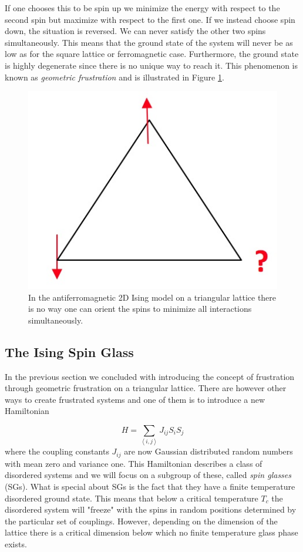 \documentclass[paper=a4, fontsize=11pt]{scrartcl} %
\numberwithin{equation}{section} %
\numberwithin{figure}{section} %
\numberwithin{table}{section} %
\begin{document}
If one chooses this to be spin up we minimize the energy with respect to the second spin but maximize with respect to the first one. If we instead choose spin down, the situation is reversed. We can never satisfy the other two spins simultaneously. This means that the ground state of the system will never be as low as for the square lattice or ferromagnetic case. Furthermore, the ground state is highly degenerate since there is no unique way to reach it. This phenomenon is known as \emph{geometric frustration} and is illustrated in Figure \ref{fig:frustration}.

\begin{figure}
\centering
\includegraphics[scale=0.5]{images/frustration.jpg}
\caption{In the antiferromagnetic 2D Ising model on a triangular lattice there is no way one can orient the spins to minimize all interactions simultaneously.}
\label{fig:frustration}
\end{figure}

\subsection{The Ising Spin Glass}
In the previous section we concluded with introducing the concept of frustration through geometric frustration on a triangular lattice. There are however other ways to create frustrated systems and one of them is to introduce a new Hamiltonian

\begin{equation}
H=\sum\limits_{\left\langle i,j \right\rangle} J_{ij} S_{i} S_{j}
\end{equation}
where the coupling constants $J_{ij}$ are now Gaussian distributed random numbers with mean zero and variance one. This Hamiltonian describes a class of disordered systems and we will focus on a subgroup of these, called \emph{spin glasses} (SGs). What is special about SGs is the fact that they have a finite temperature disordered ground state. This means that below a critical temperature $T_c$ the disordered system will "freeze" with the spins in random positions determined by the particular set of couplings. However, depending on the dimension of the lattice there is a critical dimension below which no finite temperature glass phase exists\cite{almeida}.
\end{document}
